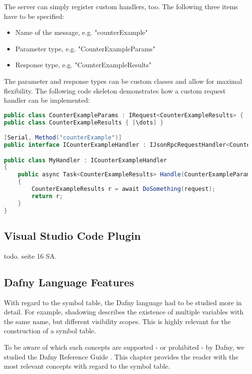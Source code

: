 The server can simply register custom handlers, too. The following three items have to be specified:
\begin{itemize}
    \item Name of the message, e.g. "counterExample"
    \item Parameter type, e.g. "CounterExampleParams"
    \item Response type, e.g. "CounterExampleResults"
\end{itemize}


The parameter and response types can be custom classes and allow for maximal flexibility. The following code skeleton demonstrates how a custom request handler can be implemented:

\begin{lstlisting}[language=csharp, caption={LSP Handler Implementation}, captionpos=b, label={lst:lspcustomhandler}]
public class CounterExampleParams : IRequest<CounterExampleResults> { [\dots] }
public class CounterExampleResults { [\dots] }

[Serial, Method("counterExample")]
public interface ICounterExampleHandler : IJsonRpcRequestHandler<CounterExampleParams, CounterExampleResults> { }

public class MyHandler : ICounterExampleHandler
{
    public async Task<CounterExampleResults> Handle(CounterExampleParams request, CancellationToken c)
    {
        CounterExampleResults r = await DoSomething(request);
        return r;
    }
}
\end{lstlisting}


\subsection{Visual Studio Code Plugin}
todo. seite 16 SA.


\subsection{Dafny Language Features}
With regard to the symbol table, the Dafny language had to be studied more in detail. For example, shadowing describes the existence of multiple variables with the same name, but different visibility scopes. This is highly relevant for the construction of a symbol table.

To be aware of which such concepts are supported - or prohibited - by Dafny, we studied the Dafny Reference Guide \cite{dafnyReferenceManual}. This chapter provides the reader with the most relevant concepts with regard to the symbol table.


